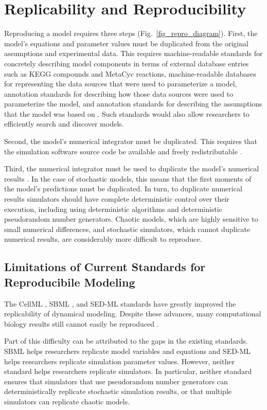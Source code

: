 \documentclass[journal,transmag,twoside]{IEEEtran}
\begin{document}
\section{Replicability and Reproducibility}
Reproducing a model requires three steps (Fig.~\ref{fig_repro_diagram}). First, the model's equations and parameter values must be duplicated from the original assumptions and experimental data. This requires machine-readable standards for concretely describing model components in terms of external database entries such as KEGG \cite{kanehisa2000kegg} compounds and MetaCyc \cite{caspi2008metacyc} reactions, machine-readable databases for representing the data sources that were used to parameterize a model, annotation standards for describing how those data sources were used to parameterize the model, and annotation standards for describing the assumptions that the model was based on \cite{boulton2012open}. Such standards would also allow researchers to efficiently search and discover models.

Second, the model's numerical integrator must be duplicated. This requires that the simulation software source code be available and freely redistributable \cite{easterbrook2014open}.

Third, the numerical integrator must be used to duplicate the model's numerical results \cite{easterbrook2014open}. In the case of stochastic models, this means that the first moments of the model's predictions must be duplicated. In turn, to duplicate numerical results simulators should have complete deterministic control over their execution, including using deterministic algorithms and deterministic pseudorandom number generators. Chaotic models, which are highly sensitive to small numerical differences, and stochastic simulators, which cannot duplicate numerical results, are considerably more difficult to reproduce.

\subsection{Limitations of Current Standards for Reproducibile Modeling}

The CellML \cite{cuellar2003overview}, SBML \cite{hucka2003}, and SED-ML \cite{sedml2011} standards have greatly improved the replicability of dynamical modeling.
Despite these advances, many computational biology results still cannot easily be reproduced \cite{garijo2013quantifying}.

Part of this difficulty can be attributed to the gaps in the existing standards.
SBML helps researchers replicate model variables and equations and SED-ML helps researchers replicate simulation parameter values. 
However, neither standard helps researchers replicate simulators. 
In particular, neither standard ensures that simulators that use pseudorandom number generators can deterministically replicate stochastic simulation results, 
or that multiple simulators can replicate chaotic models.
\end{document}
